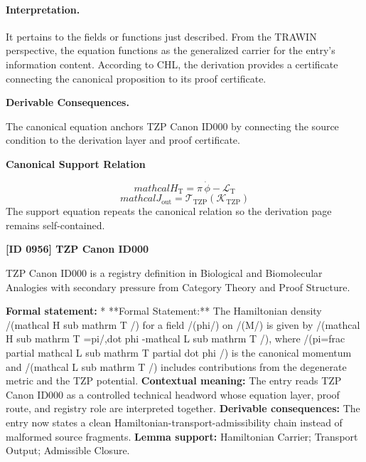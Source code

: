 \paragraph{Interpretation.}
It pertains to the fields or functions just described. From the TRAWIN perspective, the equation functions as the generalized carrier for the entry’s information content. According to CHL, the derivation provides a certificate connecting the canonical proposition to its proof certificate.

\par\vspace{0.35em}
\noindent\textbf{Derivable Consequences.}\quad
\begingroup
\footnotesize
\raggedright
The canonical equation anchors TZP Canon ID000 by connecting the source condition to the derivation layer and proof certificate.
\par\endgroup

\noindent\textbf{Canonical Support Relation}\par
\[
mathcal{H}_{\mathrm{T}}=\pi\,\dot{\phi}-\mathcal{L}_{\mathrm{T}}
\]
\[
mathcal{J}_{\mathrm{out}} = \mathcal{T}_{\mathrm{TZP}}\!\left(\mathcal{K}_{\mathrm{TZP}}\right)
\]
\noindent The support equation repeats the canonical relation so the derivation page remains self-contained.\par

\clearpage
\noindent\textbf{[ID 0956] TZP Canon ID000}\par
\vspace{0.35em}
\begingroup\small
{}
TZP Canon ID000 is a registry definition in Biological and Biomolecular Analogies with secondary pressure from Category Theory and Proof Structure.

\begingroup\footnotesize\setlength{\emergencystretch}{3em}\sloppy
\textbf{Formal statement:} * **Formal Statement:** The Hamiltonian density /(mathcal H sub mathrm T /) for a field /(phi/) on /(M/) is given by /(mathcal H sub mathrm T =pi/,dot phi -mathcal L sub mathrm T /), where /(pi=frac partial mathcal L sub mathrm T partial dot phi /) is the canonical momentum and /(mathcal L sub mathrm T /) includes contributions from the degenerate metric and the TZP potential. \textbf{Contextual meaning:} The entry reads TZP Canon ID000 as a controlled technical headword whose equation layer, proof route, and registry role are interpreted together. \textbf{Derivable consequences:} The entry now states a clean Hamiltonian-transport-admissibility chain instead of malformed source fragments. \textbf{Lemma support:} Hamiltonian Carrier; Transport Output; Admissible Closure.\par
\endgroup

